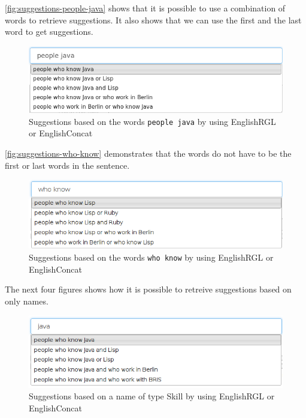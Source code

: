 \autoref{fig:suggestions-people-java} shows that it is possible to use a combination of words to retrieve suggestions. It also shows that we can use the first and the last word to get suggestions.

\begin{figure}[H]
\includegraphics[scale=0.6,keepaspectratio,valign=t]{./gfx/people-java.png}
\caption{Suggestions based on the words \texttt{people java} by using EnglishRGL or EnglishConcat\label{fig:suggestions-people-java}}
\end{figure}

\autoref{fig:suggestions-who-know} demonstrates that the words do not have to be the first or last words in the sentence.

\begin{figure}[H]
\includegraphics[scale=0.6,keepaspectratio,valign=t]{./gfx/who_know.png}
\caption{Suggestions based on the words \texttt{who know} by using EnglishRGL or EnglishConcat\label{fig:suggestions-who-know}}
\end{figure}

The next four figures shows how it is possible to retreive suggestions based on only names.

\begin{figure}[H]
\includegraphics[scale=0.6,keepaspectratio,valign=t]{./gfx/java.png}
\caption{Suggestions based on a name of type Skill by using EnglishRGL or EnglishConcat\label{fig:name-skill}}
\end{figure}

